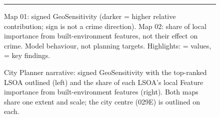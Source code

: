 \begin{figure}[htbp]
\begin{tcolorbox}[enhanced, colback=white, colframe=cardRule, arc=3mm, boxrule=0.6pt,
                  left=3mm, right=3mm, top=4mm, bottom=4mm, fontupper=\sffamily\small\color{cardInk}]
\medskip
{\color{cardRule}\rule{\linewidth}{0.4pt}}\par\smallskip
{\color{cardMuted}\footnotesize Map 01: signed GeoSensitivity (darker = higher relative contribution;
sign is not a crime direction). Map 02: share of local importance from built-environment features,
not their effect on crime. Model behaviour, not planning targets.
Highlights:  = values,  = key findings.}

\end{tcolorbox}
\caption{City Planner narrative: signed GeoSensitivity with the top-ranked LSOA outlined (left) and
the share of each LSOA's local Feature importance from built-environment features (right). Both maps
share one extent and scale; the city centre (029E) is outlined on each.}
\label{fig:stakeholder-planner}
\end{figure}
